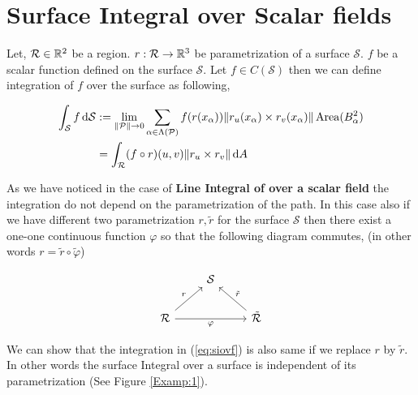 \documentclass[../Analysis-3.tex]{subfiles}
\begin{document}
\section{Surface Integral over Scalar fields}

Let, $\mathcal{R} \in \mathbb{R}^2$ be a region. $r:\mathcal{R} \to \mathbb{R}^3$ be parametrization of a surface $\mathcal{S}$. $f$ be a scalar function defined on the surface $\mathcal{S}$. Let $f \in C(\mathcal{S})$ then we can define integration of $f$ over the surface as following,

\begin{align}
  \int_{\mathcal{S}} f \, \dd \mathcal{S}
   & := \lim_{\norm{\mathcal{P}} \to 0} \sum_{\alpha \in \Lambda (\mathcal{P})} f(r(x_{\alpha})) \norm{r_u(x_{\alpha}) \times r_v(x_{\alpha})} \operatorname{Area}(B_{\alpha}^2) \nonumber \\
   & = \int_{\mathcal{R}} (f \circ r)(u,v) \norm{r_u \times r_v} \, \dd A \label{eq:siovf}
\end{align}

As we have noticed in the case of \textbf{Line Integral of over a scalar field} the integration do not depend on the parametrization of the path. In this case also if we have different two parametrization $r, \tilde{r}$ for the surface $\mathcal{S}$ then there exist a one-one continuous function $\varphi$ so that the following diagram commutes, (in other words $r = \tilde{r} \circ \tilde{\varphi}$)

\[\begin{tikzcd}
    & {\mathcal{S}} \\
    {\mathcal{R}} && {\tilde{\mathcal{R}}}
    \arrow["r", from=2-1, to=1-2]
    \arrow["{\tilde{r}}"', from=2-3, to=1-2]
    \arrow["\varphi"', from=2-1, to=2-3]
  \end{tikzcd}\]

We can show that the integration in (\ref{eq:siovf}) is also same if we replace $r$ by $\tilde{r}$. In other words the surface Integral over a surface is independent of its parametrization (See Figure \ref{Examp:1}).
\end{document}
